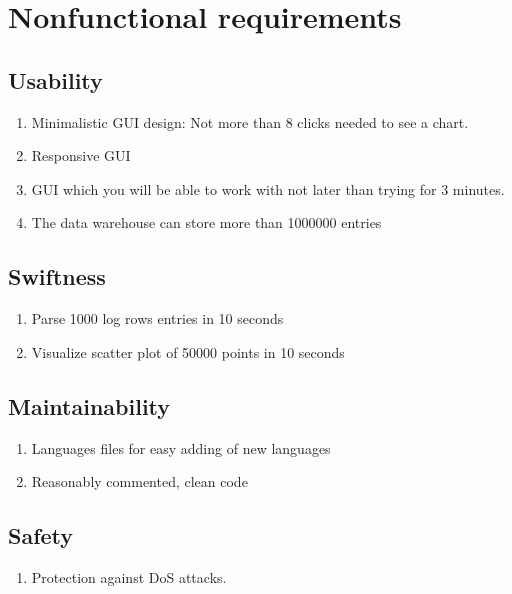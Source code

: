 \section{Nonfunctional requirements}


 
\subsection{Usability}

\begin{enumerate}[label={{/N}\itemnumber*{/}}, series=nonf]
  \item Minimalistic \gls{GUI} design: Not more than 8 clicks needed to see a chart.
  \item Responsive \gls{GUI}
  \item \gls{GUI} which you will be able to work with not later than trying for 3 minutes.
  \label{N1}
  \item The \gls{data warehouse} can store more than 1000000 entries
\end{enumerate}

\subsection{Swiftness}

\begin{enumerate}[resume*=nonf] 
	\item Parse 1000 log \glspl{row} entries in 10 seconds
	
	\item Visualize \gls{scatter plot} of 50000 points in 10 seconds %
\end{enumerate}

\subsection{Maintainability}

\begin{enumerate}[resume*=nonf]
  \item Languages files for easy adding of new languages
  \item Reasonably commented, clean code
\end{enumerate}

\subsection{Safety}
\begin{enumerate}[resume*=nonf]
  \item Protection against DoS attacks.
\end{enumerate}

